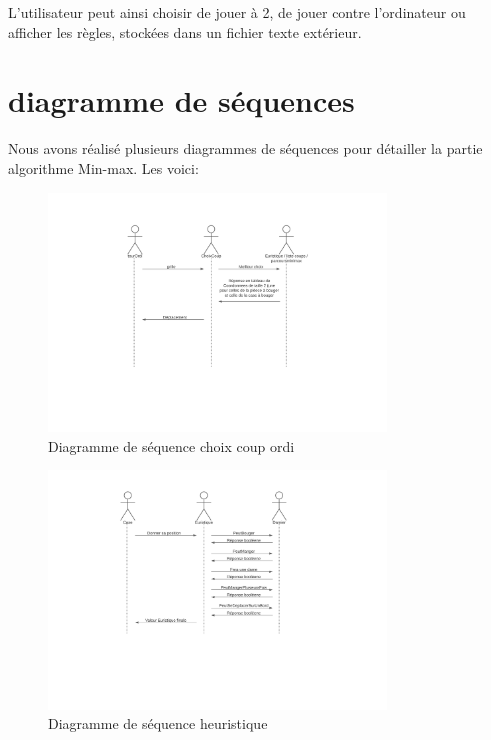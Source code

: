 \documentclass[12,french]{report}
\begin{document}
L'utilisateur peut ainsi choisir de jouer à 2, de jouer contre l'ordinateur
ou afficher les règles, stockées dans un fichier texte extérieur.

\section{diagramme de séquences}

Nous avons réalisé plusieurs diagrammes de séquences pour détailler
la partie algorithme Min-max. Les voici:

\begin{figure}[H]
	\center
	\includegraphics[width=0.8\textwidth]{./Images/Diagramme_de_sequence1}
	\caption{Diagramme de séquence choix coup ordi}
\end{figure}\vspace{0.2cm}

\begin{figure}[H]
	\center
	\includegraphics[width=0.8\textwidth]{./Images/Diagramme_de_sequence2}
	\caption{Diagramme de séquence heuristique}
\end{figure}\vspace{0.2cm}
\end{document}
